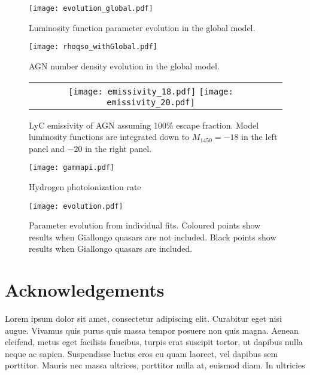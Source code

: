 \documentclass[a4paper,fleqn,usenatbib]{mnras}
\begin{document}
\begin{figure*}
  \begin{center}
    \texttt{[image: evolution\_global.pdf]}
  \end{center}
  \caption{Luminosity function parameter evolution in the global model.}
\end{figure*}

\begin{figure*}
  \begin{center}
    \texttt{[image: rhoqso\_withGlobal.pdf]}
  \end{center}
  \caption{AGN number density evolution in the global model.}
  \label{fig:rhoqso}
\end{figure*}

\begin{figure*}
  \begin{center}
    \begin{tabular}{cc}
    \texttt{[image: emissivity\_18.pdf]}
    \texttt{[image: emissivity\_20.pdf]}
    \end{tabular}
  \end{center}
  \caption{LyC emissivity of AGN assuming 100\% escape fraction.
    Model luminosity functions are integrated down to $M_{1450}=-18$
    in the left panel and $-20$ in the right panel.}
  \label{fig:gammapi}
\end{figure*}

\begin{figure*}
  \begin{center}
    \texttt{[image: gammapi.pdf]}
  \end{center}
  \caption{Hydrogen photoionization rate}
  \label{fig:gammapi}
\end{figure*}

\begin{figure*}
  \begin{center}
    \texttt{[image: evolution.pdf]}
  \end{center}
  \caption{Parameter evolution from individual fits.  Coloured points
    show results when Giallongo quasars are not included.  Black
    points show results when Giallongo quasars are included.}
\end{figure*}

\section*{Acknowledgements}

Lorem ipsum dolor sit amet, consectetur adipiscing elit. Curabitur
eget nisi augue. Vivamus quis purus quis massa tempor posuere non quis
magna. Aenean eleifend, metus eget facilisis faucibus, turpis erat
suscipit tortor, ut dapibus nulla neque ac sapien. Suspendisse luctus
eros eu quam laoreet, vel dapibus sem porttitor. Mauris nec massa
ultrices, porttitor nulla at, euismod diam. In ultricies




\bsp
\label{lastpage}
\end{document}
